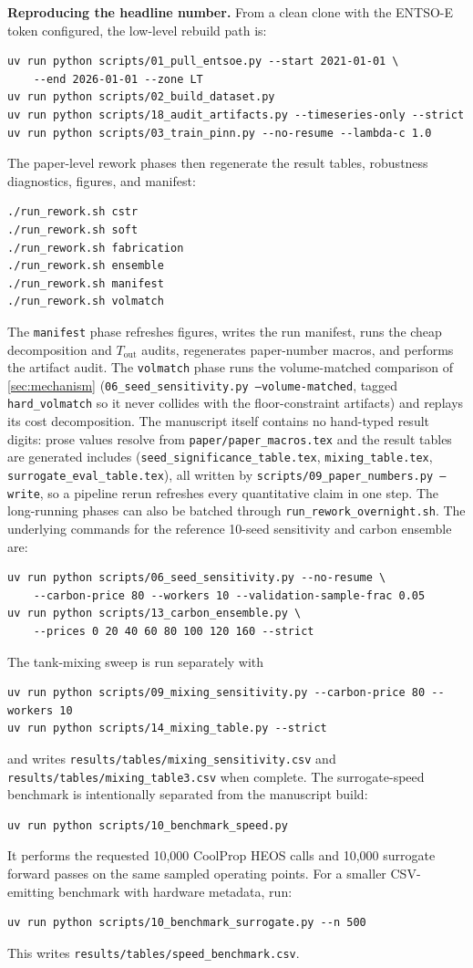 \documentclass[11pt]{article}
\begin{document}
\textbf{Reproducing the headline number.} From a clean clone with the ENTSO-E
token configured, the low-level rebuild path is:
\begin{verbatim}
uv run python scripts/01_pull_entsoe.py --start 2021-01-01 \
    --end 2026-01-01 --zone LT
uv run python scripts/02_build_dataset.py
uv run python scripts/18_audit_artifacts.py --timeseries-only --strict
uv run python scripts/03_train_pinn.py --no-resume --lambda-c 1.0
\end{verbatim}
The paper-level rework phases then regenerate the result tables, robustness
diagnostics, figures, and manifest:
\begin{verbatim}
./run_rework.sh cstr
./run_rework.sh soft
./run_rework.sh fabrication
./run_rework.sh ensemble
./run_rework.sh manifest
./run_rework.sh volmatch
\end{verbatim}
The \texttt{manifest} phase refreshes figures, writes the run manifest, runs the
cheap decomposition and $T_{\text{out}}$ audits, regenerates paper-number
macros, and performs the artifact audit. The \texttt{volmatch} phase runs the
volume-matched comparison of \cref{sec:mechanism}
(\texttt{06\_seed\_sensitivity.py --volume-matched}, tagged
\texttt{hard\_volmatch} so it never collides with the floor-constraint
artifacts) and replays its cost decomposition. The manuscript itself contains no
hand-typed result digits: prose values resolve from
\texttt{paper/paper\_macros.tex} and the result tables are generated includes
(\texttt{seed\_significance\_table.tex}, \texttt{mixing\_table.tex},
\texttt{surrogate\_eval\_table.tex}), all written by
\texttt{scripts/09\_paper\_numbers.py --write}, so a pipeline rerun refreshes
every quantitative claim in one step.
The long-running phases can also be batched through
\texttt{run\_rework\_overnight.sh}. The underlying commands for the reference
10-seed sensitivity and carbon ensemble are:
\begin{verbatim}
uv run python scripts/06_seed_sensitivity.py --no-resume \
    --carbon-price 80 --workers 10 --validation-sample-frac 0.05
uv run python scripts/13_carbon_ensemble.py \
    --prices 0 20 40 60 80 100 120 160 --strict
\end{verbatim}
The tank-mixing sweep is run separately with
\begin{verbatim}
uv run python scripts/09_mixing_sensitivity.py --carbon-price 80 --workers 10
uv run python scripts/14_mixing_table.py --strict
\end{verbatim}
and writes \texttt{results/tables/mixing\_sensitivity.csv} and
\texttt{results/tables/mixing\_table3.csv} when complete. The
surrogate-speed benchmark is intentionally separated from the manuscript build:
\begin{verbatim}
uv run python scripts/10_benchmark_speed.py
\end{verbatim}
It performs the requested 10,000 CoolProp HEOS calls and 10,000 surrogate
forward passes on the same sampled operating points.
For a smaller CSV-emitting benchmark with hardware metadata, run:
\begin{verbatim}
uv run python scripts/10_benchmark_surrogate.py --n 500
\end{verbatim}
This writes \texttt{results/tables/speed\_benchmark.csv}.
\end{document}
